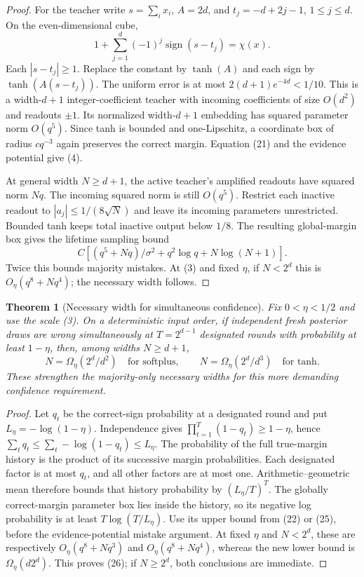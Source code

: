 \documentclass[11pt]{article}
\newtheorem{theorem}{Theorem}\newtheorem{lemma}[theorem]{Lemma}
\begin{document}
\begin{proof}
For the teacher write $s=\sum_i x_i$, $A=2d$, and
$t_j=-d+2j-1$, $1\le j\le d$. On the even-dimensional cube,
\[
 1+\sum_{j=1}^d(-1)^j\operatorname{sign}(s-t_j)=\chi(x).
\]
Each $|s-t_j|\ge1$. Replace the constant by $\tanh(A)$ and each sign
by $\tanh(A(s-t_j))$. The uniform error is at most
$2(d+1)e^{-4d}<1/10$. This is a width-$d+1$ integer-coefficient teacher
with incoming coefficients of size $O(d^2)$ and readouts $\pm1$.
Its normalized width-$d+1$ embedding has squared parameter norm
$O(q^5)$. Since tanh is bounded and one-Lipschitz, a coordinate box
of radius $cq^{-3}$ again preserves the correct margin. Equation (21)
and the evidence potential give (4).

At general width $N\ge d+1$, the active teacher's amplified readouts
have squared norm $Nq$. The incoming squared norm is still $O(q^5)$.
Restrict each inactive readout to $|a_j|\le1/(8\sqrt N)$ and leave its
incoming parameters unrestricted. Bounded tanh keeps total inactive
output below $1/8$. The resulting global-margin box gives the lifetime
sampling bound
\[
 C[(q^5+Nq)/\sigma^2+q^2\log q+N\log(N+1)].              \tag{25}
\]
Twice this bounds majority mistakes. At (3) and fixed $\eta$, if
$N<2^d$ this is $O_\eta(q^8+Nq^4)$; the necessary width follows.
\end{proof}

\begin{theorem}[Necessary width for simultaneous confidence]
Fix $0<\eta<1/2$ and use the scale (3). On a deterministic input order,
if independent fresh posterior draws are wrong simultaneously at
$T=2^{d-1}$ designated rounds with probability at least $1-\eta$,
then, among widths $N\ge d+1$,
\[
 N=\Omega_\eta(2^d/d^2)\quad\text{for softplus},\qquad
 N=\Omega_\eta(2^d/d^3)\quad\text{for tanh}.                 \tag{26}
\]
These strengthen the majority-only necessary widths for this more
demanding confidence requirement.
\end{theorem}
\begin{proof}
Let $q_t$ be the correct-sign probability at a designated round and put
$L_\eta=-\log(1-\eta)$. Independence gives
$\prod_{t=1}^T(1-q_t)\ge1-\eta$, hence
$\sum_tq_t\le\sum_t-\log(1-q_t)\le L_\eta$.
The probability of the full true-margin history is the product of its
successive margin probabilities. Each designated factor is at most
$q_t$, and all other factors are at most one. Arithmetic--geometric
mean therefore bounds that history probability by $(L_\eta/T)^T$.
The globally correct-margin parameter box lies inside the history, so
its negative log probability is at least $T\log(T/L_\eta)$.
Use its upper bound from (22) or (25), before the evidence-potential
mistake argument. At fixed $\eta$ and $N<2^d$, these are respectively
$O_\eta(q^8+Nq^3)$ and $O_\eta(q^8+Nq^4)$, whereas the new lower
bound is $\Omega_\eta(d2^d)$. This proves (26); if $N\ge2^d$,
both conclusions are immediate.
\end{proof}
\end{document}
